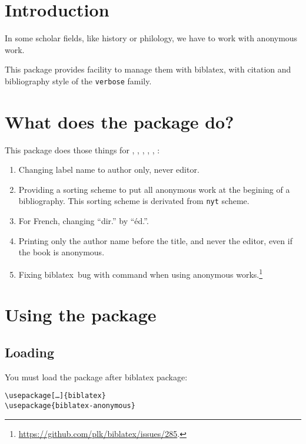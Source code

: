 \documentclass{ltxdockit}[2011/03/25]
\newcommand{\biblatex}{biblatex\xspace}
\newcommand{\namebibstyle}[1]{\texttt{#1}}
\begin{document}
\printtitlepage
\tableofcontents

\section{Introduction}

In some scholar fields, like history or philology, we have to work with anonymous work. 

This package provides facility to manage them with \biblatex, with citation and bibliography style of the \namebibstyle{verbose} family.

\section{What does the package do?}

This package does those things for  , , , , , :
\begin{enumerate}
	

	\item Changing label name to author only, never editor.
	\item Providing a sorting scheme to put all anonymous work at the begining of a bibliography. This sorting scheme is derivated from \verb+nyt+ scheme.
	\item For French, changing \enquote{dir.} by \enquote{éd.}.
	\item Printing only the author name  before the title, and never the editor, even if the book is anonymous.
 	\item Fixing \biblatex\ bug with  \expandafter\cs\expandafter{\meta{xx}cites} command when using anonymous works.\footnote{\url{https://github.com/plk/biblatex/issues/285}.}
		
\end{enumerate}

\section{Using the package}

\subsection{Loading}
You must load the package after \biblatex package:
\begin{verbatim}
\usepackage[…]{biblatex}
\usepackage{biblatex-anonymous}
\end{verbatim}
\end{document}

